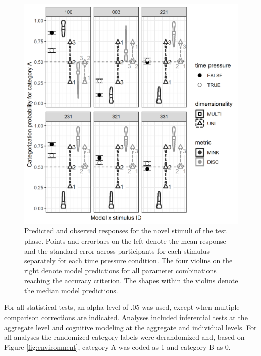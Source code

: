 \documentclass[a4paper,man,natbib]{apa6}
\begin{document}
\begin{figure}[htbp]
\centering
\includegraphics[width = \textwidth]{fig_pred_obs_agg.png}
\caption{Predicted and observed responses for the novel stimuli of the test phase. Points and errorbars on the left denote the mean response and the standard error across participants for each stimulus separately for each time pressure condition. The four violins on the right denote model predictions for all parameter combinations reaching the accuracy criterion. The shapes within the violins denote the median model predictions.}
\label{fig:pred_obs_agg}
\end{figure}

For all statistical tests, an alpha level of .05 was used, except when multiple comparison corrections are indicated. Analyses included inferential tests at the aggregate level and cognitive modeling at the aggregate and individual levels. For all analyses the randomized category labels were derandomized and, based on Figure \ref{fig:environment}, category A was coded as 1 and category B as 0.
\end{document}
